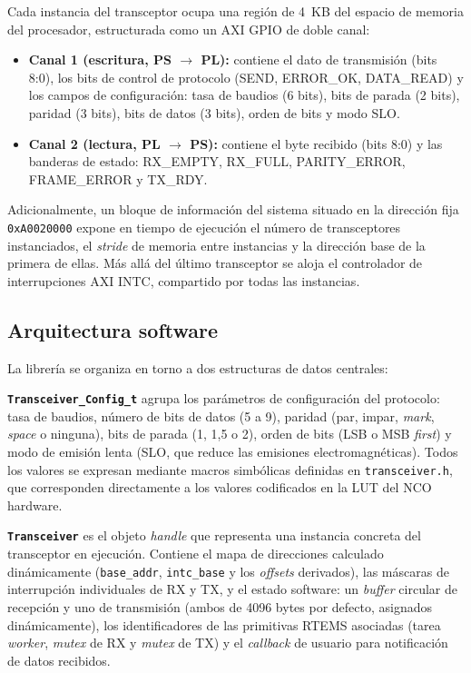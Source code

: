 Cada instancia del transceptor ocupa una región de 4~KB del espacio de memoria del
procesador, estructurada como un AXI GPIO de doble canal:

\begin{itemize}
    \item \textbf{Canal 1 (escritura, PS $\rightarrow$ PL):} contiene el dato de transmisión (bits 8:0),
    los bits de control de protocolo (SEND, ERROR\_OK, DATA\_READ) y los campos de
    configuración: tasa de baudios (6 bits), bits de parada (2 bits), paridad (3 bits), bits de
    datos (3 bits), orden de bits y modo SLO.

    \item \textbf{Canal 2 (lectura, PL $\rightarrow$ PS):} contiene el byte recibido (bits 8:0) y las
    banderas de estado: RX\_EMPTY, RX\_FULL, PARITY\_ERROR, FRAME\_ERROR y TX\_RDY.
\end{itemize}

Adicionalmente, un bloque de información del sistema situado en la dirección fija
\texttt{0xA0020000} expone en tiempo de ejecución el número de transceptores instanciados, el
\textit{stride} de memoria entre instancias y la dirección base de la primera de ellas. Más allá del
último transceptor se aloja el controlador de interrupciones AXI INTC, compartido por todas
las instancias.

\subsection{Arquitectura software}

La librería se organiza en torno a dos estructuras de datos centrales:

\textbf{\texttt{Transceiver\_Config\_t}} agrupa los parámetros de configuración del protocolo: tasa de
baudios, número de bits de datos (5 a 9), paridad (par, impar, \textit{mark}, \textit{space} o ninguna),
bits de parada (1, 1,5 o 2), orden de bits (LSB o MSB \textit{first}) y modo de emisión lenta (SLO,
que reduce las emisiones electromagnéticas). Todos los valores se expresan mediante macros
simbólicas definidas en \texttt{transceiver.h}, que corresponden directamente a los valores
codificados en la LUT del NCO hardware.

\textbf{\texttt{Transceiver}} es el objeto \textit{handle} que representa una instancia concreta del
transceptor en ejecución. Contiene el mapa de direcciones calculado dinámicamente
(\texttt{base\_addr}, \texttt{intc\_base} y los \textit{offsets} derivados), las máscaras de interrupción
individuales de RX y TX, y el estado software: un \textit{buffer} circular de recepción y uno de
transmisión (ambos de 4096 bytes por defecto, asignados dinámicamente), los
identificadores de las primitivas RTEMS asociadas (tarea \textit{worker}, \textit{mutex} de RX y \textit{mutex} de
TX) y el \textit{callback} de usuario para notificación de datos recibidos.

